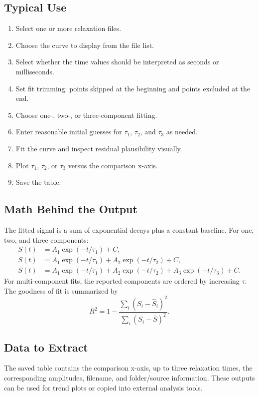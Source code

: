 \documentclass[11pt,a4paper]{article}
\begin{document}
\subsection{Typical Use}
\begin{enumerate}
  \item Select one or more relaxation files.
  \item Choose the curve to display from the file list.
  \item Select whether the time values should be interpreted as seconds or milliseconds.
  \item Set fit trimming: points skipped at the beginning and points excluded at the end.
  \item Choose one-, two-, or three-component fitting.
  \item Enter reasonable initial guesses for \(\tau_1\), \(\tau_2\), and \(\tau_3\) as needed.
  \item Fit the curve and inspect residual plausibility visually.
  \item Plot \(\tau_1\), \(\tau_2\), or \(\tau_3\) versus the comparison x-axis.
  \item Save the table.
\end{enumerate}

\subsection{Math Behind the Output}
The fitted signal is a sum of exponential decays plus a constant baseline. For one, two, and three components:
\begin{align}
S(t)&=A_1\exp(-t/\tau_1)+C,\\
S(t)&=A_1\exp(-t/\tau_1)+A_2\exp(-t/\tau_2)+C,\\
S(t)&=A_1\exp(-t/\tau_1)+A_2\exp(-t/\tau_2)+A_3\exp(-t/\tau_3)+C.
\end{align}
For multi-component fits, the reported components are ordered by increasing \(\tau\). The goodness of fit is summarized by
\begin{equation}
R^2=1-\frac{\sum_i(S_i-\hat{S}_i)^2}{\sum_i(S_i-\bar{S})^2}.
\end{equation}

\subsection{Data to Extract}
The saved table contains the comparison x-axis, up to three relaxation times, the corresponding amplitudes, filename, and folder/source information. These outputs can be used for trend plots or copied into external analysis tools.
\end{document}
